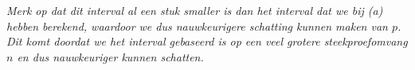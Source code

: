 \begin{enumerate}[label=(\alph*)]
{        {
            \itshape Merk op dat dit interval al een stuk smaller is dan het interval dat we bij (a) hebben berekend, waardoor we dus nauwkeurigere schatting kunnen maken van $p$.
            Dit komt doordat we het interval gebaseerd is op een veel grotere steekproefomvang $n$ en dus nauwkeuriger kunnen schatten.
        }
    }
\end{enumerate}
